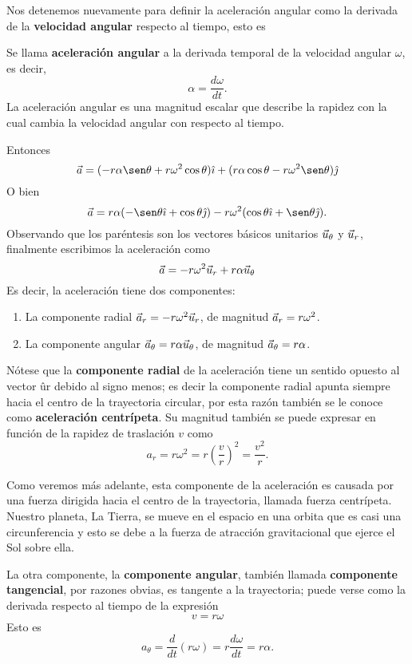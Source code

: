 Nos detenemos nuevamente para definir la aceleración angular como la derivada de la \textbf{velocidad angular} respecto al tiempo, esto es
\begin{definition}{}{}
    Se llama \textbf{aceleración angular} a la derivada temporal de la velocidad angular $\omega$, es decir,
    \begin{equation*}
        \alpha = \frac{d\omega}{dt}.
    \end{equation*}
    La aceleración angular es una magnitud escalar que describe la rapidez con la cual cambia la velocidad angular con respecto al tiempo.
\end{definition}
Entonces
$$\acei = (-r\alpha\sen\theta + r\omega^2\cos\theta)\veci + (r\alpha\cos\theta - r\omega^2\sen\theta)\vecj$$
O bien
$$\acei = r\alpha (-\sen\theta\veci + \cos\theta\vecj) - r\omega^2(\cos\theta\veci + \sen\theta\vecj).$$
Observando que los paréntesis son los vectores básicos unitarios $\vec{u}_\theta$ y $\vec{u}_r$, finalmente escribimos la aceleración como
$$\vec{a} = -r\omega^2\vec{u}_r + r\alpha\vec{u}_\theta$$
Es decir, la aceleración tiene dos componentes:
\begin{enumerate}[label=\emph{\roman*)}]
    \item La componente radial $\vec{a}_r = -r\omega^2\vec{u}_r$, de magnitud $\vec{a}_r = r\omega^2$.
    \item La componente angular $\vec{a}_\theta = r\alpha\vec{u}_\theta$, de magnitud $\vec{a}_\theta = r\alpha$.
\end{enumerate}
Nótese que la \textbf{componente radial} de la aceleración tiene un sentido opuesto al vector ûr debido al signo menos; es decir la componente radial apunta siempre hacia el centro de la trayectoria circular, por esta razón también se le conoce como \textbf{aceleración centrípeta}. Su magnitud también se puede expresar en función de la rapidez de traslación $v$ como
$$a_r = r\omega^2 = r\left(\frac{v}{r}\right)^2 = \frac{v^2}{r}.$$

Como veremos más adelante, esta componente de la aceleración es causada por una fuerza dirigida hacia el centro de la trayectoria, llamada fuerza centrípeta. Nuestro planeta, La Tierra, se mueve en el espacio en una orbita que es casi una circunferencia y esto se debe a la fuerza de atracción gravitacional que ejerce el Sol sobre ella.

La otra componente, la \textbf{componente angular}, también llamada \textbf{componente tangencial}, por razones obvias, es tangente a la trayectoria; puede verse como la derivada respecto al tiempo de la expresión
$$v = r\omega$$
Esto es
$$a_\theta = \frac{d}{dt}(r\omega) = r\frac{d\omega}{dt} = r\alpha.$$


